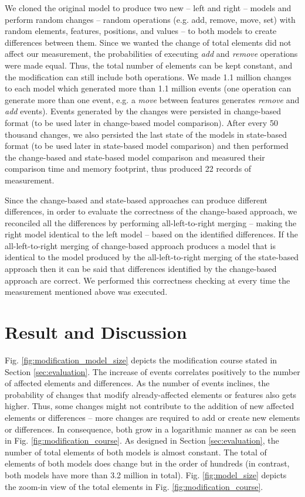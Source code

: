\documentclass{jot}
\begin{document}
We cloned the original model to produce two new -- left and right -- models and perform random changes -- random operations (e.g. add, remove, move, set) with random elements, features, positions, and values -- to both models to create differences between them. Since we wanted the change of total elements did not affect our measurement, the probabilities of executing \textit{add} and \textit{remove} operations were made equal. Thus, the total number of elements can be kept constant, and the modification can still include both operations. We made 1.1 million changes to each model which generated more than 1.1 million events (one operation can generate more than one event, e.g. a \textit{move} between features generates \textit{remove} and \textit{add} events). Events generated by the changes were persisted in change-based format (to be used later in change-based model comparison). After every 50 thousand changes, we also persisted the last state of the models in state-based format (to be used later in state-based model comparison) and then performed the change-based and state-based model comparison and measured their comparison time and memory footprint, thus produced 22 records of measurement. 

Since the change-based and state-based approaches can produce different differences, in order to evaluate the correctness of the change-based approach, we reconciled all the differences by performing all-left-to-right merging -- making the right model identical to the left model -- based on the identified differences. If the all-left-to-right merging of change-based approach produces a model that is identical to the model produced by the all-left-to-right merging of the state-based approach then it can be said that differences identified by the change-based approach are correct. We performed this correctness checking at every time the measurement mentioned above was executed.

\section{Result and Discussion}
\label{sec:discussion}

Fig. \ref{fig:modification_model_size} depicts the modification course stated in Section \ref{sec:evaluation}. The increase of events correlates positively to the number of affected elements and differences. As the number of events inclines, the probability of changes that modify already-affected elements or features also gets higher. Thus, some changes might not contribute to the addition of new affected elements or differences -- more changes are required to add or create new elements or differences. In consequence, both grow in a logarithmic manner as can be seen in Fig. \ref{fig:modification_course}. As designed in Section \ref{sec:evaluation}, the number of total elements of both models is almost constant. The total of elements of both models does change but in the order of hundreds (in contrast, both models have more than 3.2 million in total). Fig. \ref{fig:model_size} depicts the zoom-in view of the total elements in Fig. \ref{fig:modification_course}.
\end{document}
